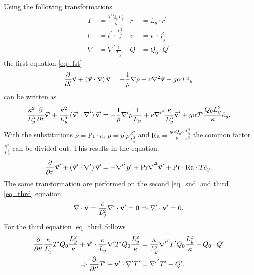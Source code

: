 \documentclass[12pt,a4paper,titlepage,headinclude,bibtotoc]{scrartcl}
\begin{document}
Using the following transformations
\begin{align*}
    T &=  \frac{T^\prime Q_0 L_y^2}{\kappa}
    &r &= L_y\cdot r^\prime \\
    t &= t^\prime \cdot \frac{L_y^2}{\kappa}
    &v &= v^\prime \cdot \frac{\kappa}{L_y}\\
    \nabla &= \nabla^\prime \frac{1}{L_y}
    &Q &= Q_0\cdot Q^\prime
\end{align*}
the first equation \eqref{eq_fst}
\begin{equation}
    \pdv{}{t}\va{v} + \left(\va{v}\cdot\nabla \right)\va{v} = - \frac{1}{\rho}\nabla p + \nu\nabla^2\va{v} + g \alpha T \hat{e}_y
\end{equation}
can be written as
\begin{equation}
    \frac{\kappa^2}{L_y^3}\pdv{}{t}\va{v}^\prime + \frac{\kappa^2}{L_y^3}\left(\va{v}^\prime \cdot\nabla^\prime\right)\va{v}^\prime = - \frac{1}{\rho} \nabla^\prime p \frac{1}{L_y} + \nu \nabla^{\prime^2} \frac{\kappa}{L_y^3}\va{v}^\prime + g \alpha T^\prime\frac{Q_0L_y^2}{\kappa} \hat{e}_y.
\end{equation}
With the substitutions $\nu = \text{Pr} \cdot \kappa$, $p = p^\prime \rho \frac{\kappa^2}{L_y^2}$ and $\text{Ra} = \frac{g\alpha Q_0 \kappa}{\nu}\frac{L_y^5}{\kappa^3}$ the common factor $\frac{\kappa^2}{L_y^3}$ can be divided out.
This results in the equation:
\begin{equation}
    \pdv{}{t^\prime}\va{v}^\prime + \left(\va{v}^\prime\cdot\nabla^\prime \right)\va{v}^\prime = - \nabla^{\prime^2} p^\prime + \text{Pr}\nabla^{\prime^2}\va{v}^\prime + \text{Pr}\cdot\text{Ra}\cdot T\hat{e}_y. \label{eq_ad_fst}
\end{equation}
The same transformation are performed on the second \eqref{eq_snd} and third \eqref{eq_thrd} equation
\begin{equation}
    \nabla \cdot \va{v} = \frac{\kappa}{L_y^2}\nabla^\prime \cdot \va{v}^\prime = 0 \Rightarrow \nabla^\prime \cdot\va{v}^\prime = 0. \label{eq_ad_snd}
\end{equation}
For the third equation \eqref{eq_thrd} follows
\begin{align}
    \pdv{}{t^\prime} \frac{\kappa}{L_y^2} T^\prime Q_0 \frac{L_y^2}{\kappa} + \va{v}^\prime\cdot \frac{\kappa}{L_y}\nabla^\prime T^\prime Q_0 \frac{L_y^2}{\kappa} &= \frac{\kappa}{L_y^2}\nabla^{\prime^2} T^\prime Q_0 \frac{L_y^2}{\kappa} + Q_0\cdot Q^\prime\\
    \Rightarrow \pdv{}{t^\prime} T^\prime + \va{v}^\prime\cdot\nabla^{\prime}T^\prime &= \nabla^{\prime^2}T^\prime + Q^\prime . \label{eq_ad_thrd}
\end{align}
\end{document}
